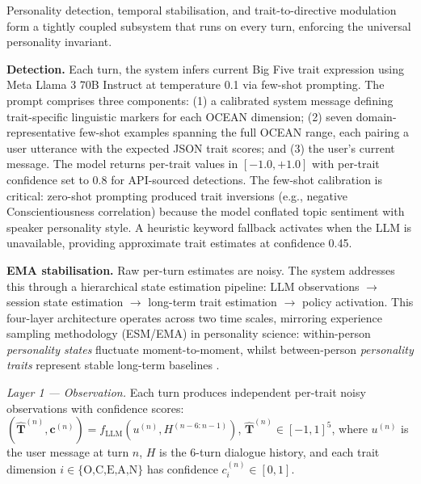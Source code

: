 \documentclass[10pt,a4paper]{report}
\begin{document}
Personality detection, temporal stabilisation, and trait-to-directive modulation form a tightly coupled subsystem that runs on every turn, enforcing the universal personality invariant.

\textbf{Detection.} Each turn, the system infers current Big Five trait expression using Meta Llama 3 70B Instruct \citep{Dubey2024} at temperature 0.1 via few-shot prompting. The prompt comprises three components: (1) a calibrated system message defining trait-specific linguistic markers for each OCEAN dimension; (2) seven domain-representative few-shot examples spanning the full OCEAN range, each pairing a user utterance with the expected JSON trait scores; and (3) the user's current message. The model returns per-trait values in $[-1.0, +1.0]$ with per-trait confidence set to 0.8 for API-sourced detections. The few-shot calibration is critical: zero-shot prompting produced trait inversions (e.g., negative Conscientiousness correlation) because the model conflated topic sentiment with speaker personality style. A heuristic keyword fallback activates when the LLM is unavailable, providing approximate trait estimates at confidence 0.45.

\textbf{EMA stabilisation.} Raw per-turn estimates are noisy. The system addresses this through a hierarchical state estimation pipeline: LLM observations $\rightarrow$ session state estimation $\rightarrow$ long-term trait estimation $\rightarrow$ policy activation. This four-layer architecture operates across two time scales, mirroring experience sampling methodology (ESM/EMA) in personality science: within-person \emph{personality states} fluctuate moment-to-moment, whilst between-person \emph{personality traits} represent stable long-term baselines \citep{Fleeson2001, Nesselroade1991}.

\emph{Layer 1 --- Observation.} Each turn produces independent per-trait noisy observations with confidence scores: $(\hat{\mathbf{T}}^{(n)}, \mathbf{c}^{(n)}) = f_{\text{LLM}}(u^{(n)}, H^{(n-6:n-1)})$, $\hat{\mathbf{T}}^{(n)} \in [-1,1]^5$, where $u^{(n)}$ is the user message at turn $n$, $H$ is the 6-turn dialogue history, and each trait dimension $i \in \{\text{O,C,E,A,N}\}$ has confidence $c_i^{(n)} \in [0,1]$.
\end{document}
